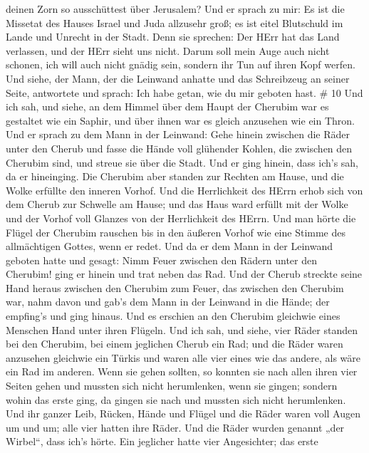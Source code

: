 deinen Zorn so ausschüttest über Jerusalem?  Und er sprach
zu mir: Es ist die Missetat des Hauses Israel und Juda allzusehr groß;
es ist eitel Blutschuld im Lande und Unrecht in der Stadt. Denn sie
sprechen: Der HErr hat das Land verlassen, und der HErr sieht uns nicht.
 Darum soll mein Auge auch nicht schonen, ich will auch
nicht gnädig sein, sondern ihr Tun auf ihren Kopf werfen. 
Und siehe, der Mann, der die Leinwand anhatte und das Schreibzeug an
seiner Seite, antwortete und sprach: Ich habe getan, wie du mir geboten
hast. \# 10  Und ich sah, und siehe, an dem Himmel über dem
Haupt der Cherubim war es gestaltet wie ein Saphir, und über ihnen war
es gleich anzusehen wie ein Thron.  Und er sprach zu dem
Mann in der Leinwand: Gehe hinein zwischen die Räder unter den Cherub
und fasse die Hände voll glühender Kohlen, die zwischen den Cherubim
sind, und streue sie über die Stadt. Und er ging hinein, dass ich's sah,
da er hineinging.  Die Cherubim aber standen zur Rechten am
Hause, und die Wolke erfüllte den inneren Vorhof.  Und die
Herrlichkeit des HErrn erhob sich von dem Cherub zur Schwelle am Hause;
und das Haus ward erfüllt mit der Wolke und der Vorhof voll Glanzes von
der Herrlichkeit des HErrn.  Und man hörte die Flügel der
Cherubim rauschen bis in den äußeren Vorhof wie eine Stimme des
allmächtigen Gottes, wenn er redet.  Und da er dem Mann in
der Leinwand geboten hatte und gesagt: Nimm Feuer zwischen den Rädern
unter den Cherubim! ging er hinein und trat neben das Rad. 
Und der Cherub streckte seine Hand heraus zwischen den Cherubim zum
Feuer, das zwischen den Cherubim war, nahm davon und gab's dem Mann in
der Leinwand in die Hände; der empfing's und ging hinaus. 
Und es erschien an den Cherubim gleichwie eines Menschen Hand unter
ihren Flügeln.  Und ich sah, und siehe, vier Räder standen
bei den Cherubim, bei einem jeglichen Cherub ein Rad; und die Räder
waren anzusehen gleichwie ein Türkis  und waren alle vier
eines wie das andere, als wäre ein Rad im anderen.  Wenn
sie gehen sollten, so konnten sie nach allen ihren vier Seiten gehen und
mussten sich nicht herumlenken, wenn sie gingen; sondern wohin das erste
ging, da gingen sie nach und mussten sich nicht herumlenken.
 Und ihr ganzer Leib, Rücken, Hände und Flügel und die
Räder waren voll Augen um und um; alle vier hatten ihre Räder.
 Und die Räder wurden genannt „der Wirbel``, dass ich's
hörte.  Ein jeglicher hatte vier Angesichter; das erste
